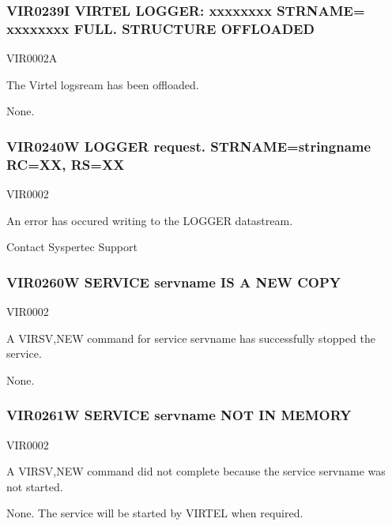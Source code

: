 \documentclass[letterpaper,10pt,english]{sphinxmanual}
\begin{document}
\subsubsection{VIR0239I VIRTEL LOGGER: xxxxxxxx STRNAME= xxxxxxxx FULL. STRUCTURE OFFLOADED}
\label{\detokenize{messages:vir0239i-virtel-logger-xxxxxxxx-strname-xxxxxxxx-full-structure-offloaded}}\begin{description}
\sphinxAtStartPar
VIR0002A

\sphinxAtStartPar
The Virtel logsream has been offloaded.

\sphinxAtStartPar
None.

\end{description}


\subsubsection{VIR0240W LOGGER request. STRNAME=stringname RC=XX, RS=XX}
\label{\detokenize{messages:vir0240w-logger-request-strname-stringname-rc-xx-rs-xx}}\begin{description}
\sphinxAtStartPar
VIR0002

\sphinxAtStartPar
An error has occured writing to the LOGGER datastream.

\sphinxAtStartPar
Contact Syspertec Support

\end{description}


\subsubsection{VIR0260W SERVICE servname IS A NEW COPY}
\label{\detokenize{messages:vir0260w-service-servname-is-a-new-copy}}\begin{description}
\sphinxAtStartPar
VIR0002

\sphinxAtStartPar
A VIRSV,NEW command for service servname has successfully stopped the service.

\sphinxAtStartPar
None.

\end{description}


\subsubsection{VIR0261W SERVICE servname NOT IN MEMORY}
\label{\detokenize{messages:vir0261w-service-servname-not-in-memory}}\begin{description}
\sphinxAtStartPar
VIR0002

\sphinxAtStartPar
A VIRSV,NEW command did not complete because the service servname was not started.

\sphinxAtStartPar
None. The service will be started by VIRTEL when required.

\end{description}
\end{document}

